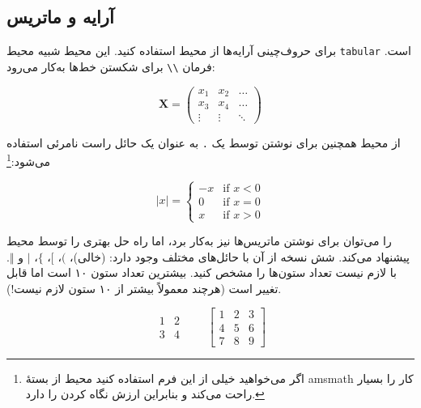 \subsection{آرایه و ماتریس} \label{sec:arraymat}

برای حروف‌چینی آرایه‌ها از محیط  استفاده کنید. این محیط شبیه محیط  \texttt{tabular} است. فرمان \verb|\\| برای شکستن خط‌ها به‌کار می‌رود:
\begin{example}
\begin{equation*}
 \mathbf{X} = \left( 
  \begin{array}{ccc}
   x_1 & x_2 & \ldots \\
   x_3 & x_4 & \ldots \\
   \vdots & \vdots & \ddots
  \end{array} \right)
\end{equation*}
\end{example}


از محیط  همچنین برای نوشتن 
توسط یک \verb|.| به عنوان یک حائل راست نامرئی استفاده می‌شود:\footnote{اگر می‌خواهید خیلی از این فرم استفاده کنید محیط  از بستۀ 
  \textsf{amsmath} کار را بسیار راحت می‌کند و بنابراین ارزش نگاه کردن را دارد.}  
\begin{example}
\begin{equation*}
|x| = \left\{
 \begin{array}{rl}
  -x & \text{if } x < 0\\
   0 & \text{if } x = 0\\
   x & \text{if } x > 0
 \end{array} \right.
\end{equation*}
\end{example}



 را می‌توان برای نوشتن ماتریس‌ها  نیز به‌کار برد، اما 
 راه‌ حل بهتری را توسط محیط  پیشنهاد می‌کند. شش نسخه از آن با حائل‌های مختلف وجود دارد: 
(خالی)،  $($،  $[$،  $\{$،  $\vert$ و
 $\Vert$. با  لازم نیست تعداد ستون‌ها را مشخص کنید. بیشترین تعداد ستون ۱۰ 
است اما قابل تغییر است 
(هرچند معمولاً بیشتر از ۱۰ ستون لازم نیست!).
\begin{example}
\begin{equation*}
 \begin{matrix} 
   1 & 2 \\
   3 & 4 
 \end{matrix} \qquad
 \begin{bmatrix} 
   1 & 2 & 3 \\
   4 & 5 & 6 \\ 
   7 & 8 & 9
 \end{bmatrix}
\end{equation*}
\end{example}


